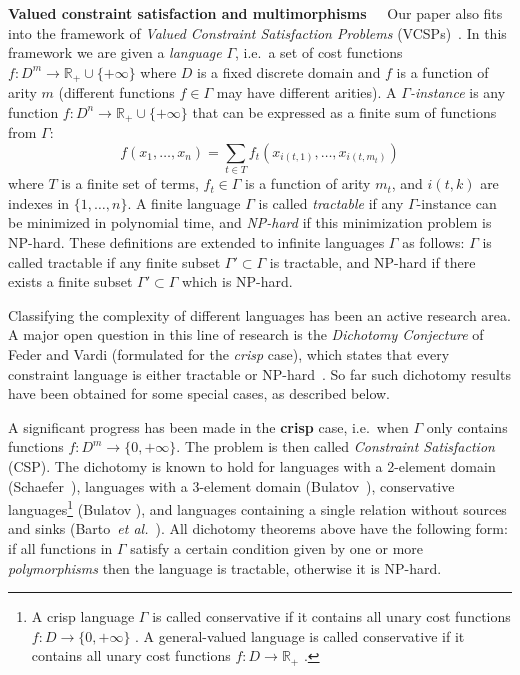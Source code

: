 \documentclass[11pt,onecolumn]{article}
\newcommand{\myparagraph}[1]{{\vspace*{2pt}\noindent\bf{#1}~~}}
\def\etal{{\em et al.}}
\begin{document}
\myparagraph{Valued constraint satisfaction and multimorphisms}
Our paper also fits into the framework of {\em Valued Constraint Satisfaction Problems} (VCSPs)~\cite{Cohen:AI06}.
In this framework we are given a {\em language} $\Gamma$, i.e.\ a set of cost functions $f:D^m\rightarrow\mathbb R_+\cup\{+\infty\}$
where $D$ is a fixed discrete domain and $f$ is a function of arity $m$ (different functions $f\in\Gamma$ may have different arities).
A {\em $\Gamma$-instance} is any function $f:D^n\rightarrow \mathbb R_+\cup\{+\infty\}$ that can be expressed as a finite sum of functions from $\Gamma$:
$$
f(x_1,\ldots,x_n)=\sum_{t\in T} f_t(x_{i(t,1)},\ldots,x_{i(t,m_t)})
$$
where $T$ is a finite set of terms, $f_t\in \Gamma$ is a function of arity $m_t$, and $i(t,k)$ are indexes in $\{1,\ldots,n\}$.
A finite language $\Gamma$ is called {\em tractable} if any $\Gamma$-instance can be minimized in polynomial time,
and {\em NP-hard} if this minimization problem is NP-hard. These definitions are extended to infinite languages $\Gamma$ 
as follows: $\Gamma$ is called tractable if any finite subset $\Gamma'\subset\Gamma$ is tractable,
and NP-hard if there exists a finite subset $\Gamma'\subset\Gamma$ which is NP-hard.

Classifying the complexity of different languages has been an active research area.
A major open question in this line of research is the
\emph{Dichotomy Conjecture} of Feder and Vardi (formulated for the {\em crisp} case), which states that every
constraint language is either tractable or NP-hard~\cite{Feder98:monotone}.
So far such dichotomy results have been obtained for some special cases, as described below.

A significant progress has been made in the {\bf crisp} case, i.e.\ when $\Gamma$ only contains functions $f:D^m\rightarrow \{0,+\infty\}$.
The problem is then called {\em Constraint Satisfaction} (CSP). The dichotomy is known to hold 
for languages with a 2-element domain (Schaefer~\cite{Schaefer78:complexity}),
languages with a 3-element domain (Bulatov~\cite{Bulatov06:3-elementJACM}),
conservative languages\footnote{A crisp language $\Gamma$ is called conservative if it contains all unary cost functions $f:D\rightarrow\{0,+\infty\}$ \cite{Bulatov03:conservative}.
A general-valued language is called conservative if it contains all unary cost functions $f:D\rightarrow \mathbb R_+$ \cite{KZ10:TRa,KZ10:TRb,K10:TRc}.
} (Bulatov \cite{Bulatov03:conservative}),
and languages containing a single relation without sources and sinks (Barto~\etal\ \cite{Barto09:siam}).
All dichotomy theorems above have the following form: if all functions in $\Gamma$ satisfy a certain
condition given by one or more {\em polymorphisms} then the language is tractable, otherwise it is NP-hard.
\end{document}
